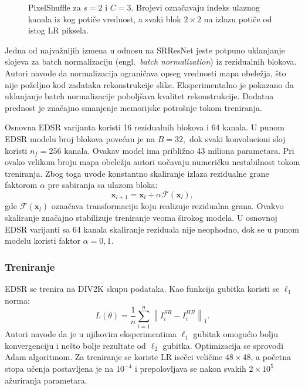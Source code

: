 \documentclass[12pt,a4paper]{article}
\begin{document}
\begin{figure}[H]
	\centering
	\resizebox{0.75\textwidth}{!}{}
	\caption{PixelShuffle za $s=2$ i $C=3$. Brojevi označavaju indeks ulaznog kanala iz kog potiče vrednost, a svaki blok $2\times2$ na izlazu potiče od istog LR piksela.}
	\label{fig:pixelshuffle}
\end{figure}

Jedna od najvažnijih izmena u odnosu na SRResNet jeste potpuno uklanjanje slojeva za batch normalizaciju (engl.\ \textit{batch normalization}) \cite{BatchNorm} iz rezidualnih blokova. Autori navode da normalizacija ograničava opseg vrednosti mapa obeležja, što nije poželjno kod zadataka rekonstrukcije slike. Eksperimentalno je pokazano da uklanjanje batch normalizacije poboljšava kvalitet rekonstrukcije. Dodatna prednost je značajno smanjenje memorijske potrošnje tokom treniranja.

Osnovna EDSR varijanta koristi 16 rezidualnih blokova i 64 kanala. U punom EDSR modelu broj blokova povećan je na $ B=32, $ dok svaki konvolucioni sloj koristi $ n_f=256 $ kanala. Ovakav model ima približno 43 miliona parametara. Pri ovako velikom broju mapa obeležja autori uočavaju numeričku nestabilnost tokom treniranja. Zbog toga uvode konstantno skaliranje izlaza rezidualne grane faktorom $\alpha$ pre sabiranja sa ulazom bloka:
\begin{equation}
	\mathbf{x}_{l+1}
	=
	\mathbf{x}_l
	+
	\alpha
	\mathcal{F}(\mathbf{x}_l),
\end{equation}
gde $\mathcal{F}(\mathbf{x}_l)$ označava transformaciju koju realizuje rezidualna grana. Ovakvo skaliranje značajno stabilizuje treniranje veoma širokog modela. U osnovnoj EDSR varijanti sa 64 kanala skaliranje reziduala nije neophodno, dok se u punom modelu koristi faktor $\alpha=0{,}1$.

\subsubsection{Treniranje}

EDSR se trenira na DIV2K \cite{DIV2K} skupu podataka. Kao funkcija gubitka koristi se $\ell_1$ norma:
\begin{equation}
	L(\theta)
	=
	\frac{1}{n}
	\sum_{i=1}^{n}
	\left\|
	I^{SR}_i-I^{HR}_i
	\right\|_1.
\label{eq:l1}
\end{equation}
Autori navode da je u njihovim eksperimentima $\ell_1$ gubitak omogućio bolju konvergenciju i nešto bolje rezultate od $\ell_2$ gubitka. Optimizacija se sprovodi Adam algoritmom. Za treniranje se koriste LR isečci veličine $48\times48$, a početna stopa učenja postavljena je na $10^{-4}$ i prepolovljava se nakon svakih $2\times10^5$ ažuriranja parametara.
\end{document}

